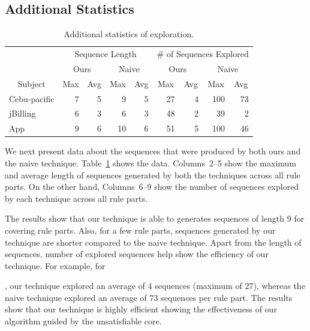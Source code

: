 \subsection{Additional Statistics}


\begin{table}[t]
\caption{Additional statistics of exploration.}
\centering
{\scriptsize
\tabcolsep=3pt
\begin{tabular}{|l|r|r|r|r|r|r|r|r|}
\hline
& \multicolumn{4}{|c|}{Sequence Length} & \multicolumn{4}{|c|}{\# of Sequences Explored} \\
\cline{2-9}
& \multicolumn{2}{|c|}{Ours} & \multicolumn{2}{|c|}{Naive} & \multicolumn{2}{|c|}{Ours} & \multicolumn{2}{|c|}{Naive}  \\
\cline{2-9}
\multicolumn{1}{|c|}{Subject} & \multicolumn{1}{|c|}{Max} & \multicolumn{1}{|c|}{Avg} & \multicolumn{1}{|c|}{Max} & \multicolumn{1}{|c|}{Avg} & \multicolumn{1}{|c|}{Max} & \multicolumn{1}{|c|}{Avg} & \multicolumn{1}{|c|}{Max} & \multicolumn{1}{|c|}{Avg} \\
\hline \hline
Cebu-pacific 	 &  7		& 5 &  9 &  5	 &  27 &  4	&  100 & 73 \\
jBilling		 	 &  6		& 3 &  6 &  3	 &  48 &  2	&  39  &  2 \\
App					 	 &  9		& 6 & 10 &  6	 &  51 &  5	& 100  & 46 \\
\hline
\end{tabular}
}
\label{tab:stats}
\end{table}

We next present data about the sequences that were produced by both ours and
the naive technique. Table~\ref{tab:stats} shows the data. Columns~2--5 show
the maximum and average length of sequences generated by both the techniques
across all rule parts. On the other hand, Columns~6--9 show the number of 
sequences explored by each technique across all rule parts. 

The results show that our technique is able to generates sequences of length $9$
for covering rule parts. Also, for a few rule parts, sequences generated by our technique are shorter
compared to the naive technique. Apart from the length of sequences, number
of explored sequences help show the efficiency of our technique. For example,
for \subject{Cebu-pacific}, our technique explored an average of $4$ sequences
(maximum of $27$), whereas the naive technique explored an average of $73$ sequences
per rule part. The results show that our technique is highly efficient showing
the effectiveness of our algorithm guided by the unsatisfiable core.

